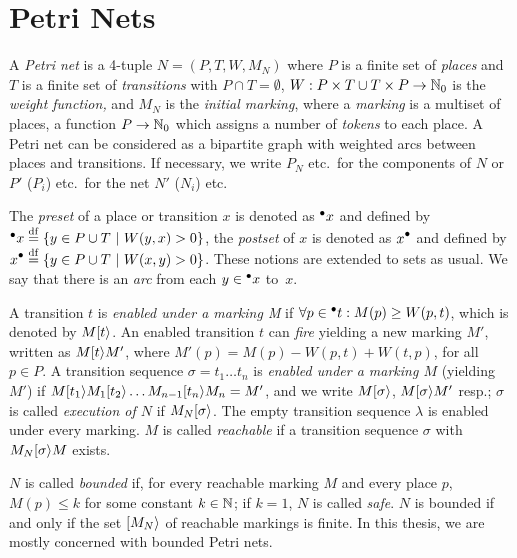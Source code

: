 \section{Petri Nets}\label{sec_pn_basic}

A \emph{Petri net} is a 4-tuple $N=(P,T,W,M_N)$ where
$P$ is a finite set of \emph{places} and $T$ is a finite set of \emph{transitions}
with $P \cap T=\emptyset$,
$W: P\times T \cup T \times P \rightarrow \mathbb{N}_0$ is the \emph{weight function,} and
$M_N$ is the \emph{initial marking}, where a \emph{marking} is a multiset of places,
\ie a function $P\rightarrow\mathbb{N}_0$ which assigns a number of \emph{tokens} to each place.
A Petri net can be considered as a bipartite graph with weighted arcs between places and transitions.
If necessary, we write $P_N$ etc.\ for the components of $N$ or $P'$ ($P_i$) etc.\ for the net $N'$ ($N_i$) etc.



The \emph{preset} of a place or transition $x$ is denoted as ${}^\bullet {x}$ and defined by
$\pre x\DEF\{y\in P\cup T\ |\  W(y,x)>0\}$,
the \emph{postset} of $x$ is denoted as $\post x$ and defined by
$\post x\DEF\{y\in P\cup T\ |\ W(x,y)>0\}$.
These notions are extended to sets as usual.
We say that there is an \emph{arc}
from each $y\in {}^\bullet {x}$ to~$x$.





A transition $t$ is \emph{enabled under a marking M}
if $\forall p\in {}^\bullet {t}:M(p)\geq W(p, t)$, which is denoted by $M[t\rangle$.
An enabled transition $t$ can \emph{fire} yielding a new marking $M'$,
written as $M[t\rangle M'$,
where $M'(p)=M(p)-W(p, t) + W(t,p)$, for all $p\in P$.
A transition sequence $\sigma=t_1\ldots t_n$ is \emph{enabled under a marking $M$} (yielding $M'$)
if $M[t_1\rangle M_1[t_2\rangle\ldots M_{n-1}[t_n\rangle M_n=M'$, and we
write $M[\sigma\rangle$, $M[\sigma\rangle M'$ resp.; $\sigma$ is called \emph{execution of $N$} if $M_N[\sigma\rangle$.
  The empty transition sequence $\lambda$ is  enabled under every marking.
$M$ is called \emph{reachable} if a transition sequence $\sigma$ with
$M_N[\sigma\rangle M$ exists.

$N$ is called \emph{bounded} if, for every reachable marking $M$ and every place $p$, $M(p)\leq k$ for some constant $k\in \mathbb{N}$; if $k=1$, $N$ is called \emph{safe}. $N$ is bounded if and only if the set $[M_N\rangle$ of reachable markings is finite. In this thesis, we are mostly concerned with bounded Petri nets.

